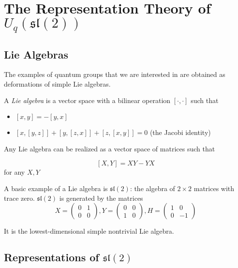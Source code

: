 \documentclass[]{article}
\begin{document}
\tableofcontents
\section{The Representation Theory of $U_q(\mathfrak{sl}(2))$}
\subsection{Lie Algebras}

The examples of quantum groups that we are interested in are obtained as deformations of simple Lie algebras. 

A \emph{Lie algebra} is a vector space with a bilinear operation $\left[ \cdot, \cdot \right]$ such that 

\begin{itemize}
    \item $\left[ x,y \right] = -\left[ y,x \right]$
    \item $\left[ x, \left[ y,z \right] \right] + \left[ y, \left[ z,x \right] \right] + \left[ z, \left[ x,y \right] \right] = 0$ (the Jacobi identity)
\end{itemize}

Any Lie algebra can be realized as a vector space of matrices such that 

\[ \left[ X,Y \right] = XY - YX\] 
for any $X,Y$

A basic example of a Lie algebra is $\mathfrak{sl}(2)$: the algebra of $2 \times 2$ matrices with trace zero. $\mathfrak{sl}(2)$ is generated by the matrices 
\begin{equation}
    X = \begin{pmatrix} 0 & 1 \\ 0 & 0 \end{pmatrix},
    Y = \begin{pmatrix} 0 & 0 \\ 1 & 0 \end{pmatrix}, 
    H = \begin{pmatrix} 1 & 0 \\ 0 &-1 \end{pmatrix}
\end{equation}

It is the lowest-dimensional simple nontrivial Lie algebra. 

\subsection{Representations of $\mathfrak{sl}(2)$}
\end{document}
